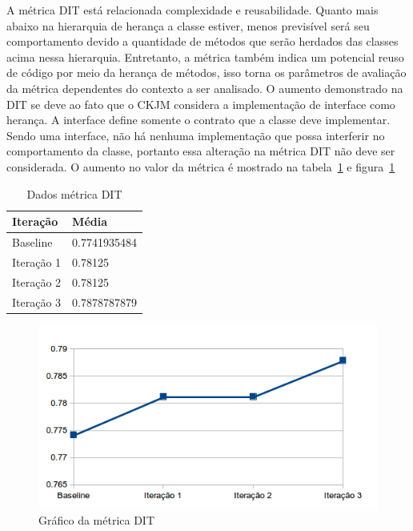 A métrica DIT está relacionada complexidade e reusabilidade. Quanto mais
abaixo na hierarquia de herança a classe estiver, menos previsível será seu
comportamento devido a quantidade de métodos que serão herdados das classes
acima nessa hierarquia. Entretanto, a métrica também indica um potencial reuso
de código por meio da herança de métodos, isso torna os parâmetros de avaliação
da métrica dependentes do contexto a ser analisado. O aumento demonstrado na DIT
se deve ao fato que o CKJM considera a implementação de interface como herança.
A interface define somente o contrato que a classe deve implementar. Sendo uma
interface, não há nenhuma implementação que possa interferir no comportamento
da classe, portanto essa alteração na métrica DIT não deve ser considerada. O
aumento no valor da métrica é mostrado na tabela~\ref{tab:dit} e
figura~\ref{fig:dit}

\begin{table}[!h]
	\centering
	    \caption{Dados métrica DIT}
    \begin{tabular}{ | l | l | }
    \hline
    Iteração & Média 			\\ \hline
    Baseline & 0.7741935484  	\\ \hline
    Iteração 1 & 0.78125		\\ \hline
	Iteração 2 & 0.78125			\\ \hline
	Iteração 3 & 0.7878787879	\\ \hline
    \end{tabular}
    \label{tab:dit}
\end{table}

\begin{figure}[!htb]
	\label{fig:dit}
	\caption{Gráfico da métrica DIT}   
	\begin{center}
		\includegraphics{img/dit.png}
	\end{center}
\end{figure}


